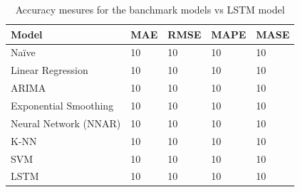 \begin{table}
\centering
    \begin{tabular}{| l | l | l | l | l|} \hline
        Model & MAE & RMSE & MAPE & MASE \\ \hline
        Naïve & 10 & 10 & 10 & 10 \\ \hline
        Linear Regression & 10 & 10 & 10 & 10 \\ \hline
        ARIMA & 10 & 10 & 10 & 10 \\ \hline
        Exponential Smoothing & 10 & 10 & 10 & 10 \\ \hline
        Neural Network (NNAR) & 10 & 10 & 10 & 10 \\ \hline
        K-NN & 10 & 10 & 10 & 10 \\ \hline
        SVM & 10 & 10 & 10 & 10 \\ \hline
        LSTM & 10 & 10 & 10 & 10 \\ \hline
    \end{tabular}
    \caption[Model comparisons]{Accuracy mesures for the banchmark models vs LSTM model}
\end{table}